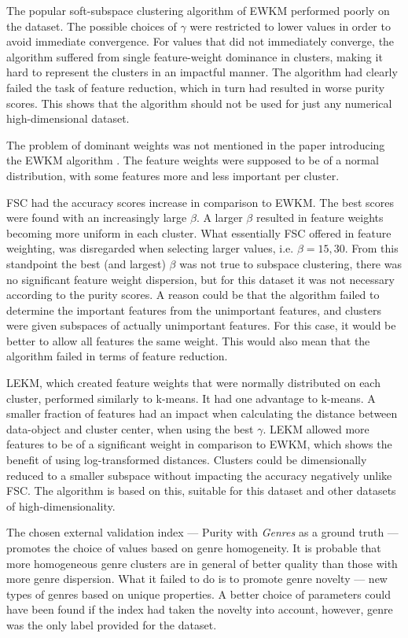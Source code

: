 \documentclass[../report.tex]{subfiles}
\begin{document}
The popular soft-subspace clustering algorithm of EWKM performed poorly on the dataset. The possible choices of $\gamma$ were restricted to lower values in order to avoid immediate convergence. For values that did not immediately converge, the algorithm suffered from single feature-weight dominance in clusters, making it hard to represent the clusters in an impactful manner. The algorithm had clearly failed the task of feature reduction, which in turn had resulted in worse purity scores. This shows that the algorithm should not be used for just any numerical high-dimensional dataset.

The problem of dominant weights was not mentioned in the paper introducing the EWKM algorithm \cite{Jing2007}.  The feature weights were supposed to be of a normal distribution, with some features more and less important per cluster.

FSC had the accuracy scores increase in comparison to EWKM. The best scores were found with an increasingly large $\beta$. A larger $\beta$ resulted in feature weights becoming more uniform in each cluster. What essentially FSC offered in feature weighting, was disregarded when selecting larger values, i.e. $\beta=15,30$. From this standpoint the best (and largest) $\beta$ was not true to subspace clustering, there was no significant feature weight dispersion, but for this dataset it was not necessary according to the purity scores. A reason could be that the algorithm failed to determine the important features from the unimportant features, and clusters were given subspaces of actually unimportant features. For this case, it would be better to allow all features the same weight. This would also mean that the algorithm failed in terms of feature reduction.

LEKM, which created feature weights that were normally distributed on each cluster, performed similarly to k-means. It had one advantage to k-means. A smaller fraction of features had an impact when calculating the distance between data-object and cluster center, when using the best $\gamma$. LEKM allowed more features to be of a significant weight in comparison to EWKM, which shows the benefit of using log-transformed distances. Clusters could be dimensionally reduced to a smaller subspace without impacting the accuracy negatively unlike FSC. The algorithm is based on this, suitable for this dataset and other datasets of high-dimensionality.

The chosen external validation index --- Purity with \textit{Genres} as a ground truth --- promotes the choice of values based on genre homogeneity. It is probable that more homogeneous genre clusters are in general of better quality than those with more genre dispersion. What it failed to do is to promote genre novelty --- new types of genres based on unique properties. A better choice of parameters could have been found if the index had taken the novelty into account, however, genre was the only label provided for the dataset.
\end{document}
